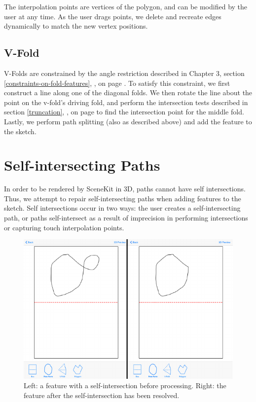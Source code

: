 The interpolation points are vertices of the polygon, and can be
modified by the user at any time. As the user drags points, we delete
and recreate edges dynamically to match the new vertex positions.

\subsection{V-Fold}\label{v-fold}

V-Folds are constrained by the angle restriction described in Chapter 3,
section \ref{constraints-on-fold-features},
, on page
\pageref{geometric-constraints}. To satisfy this constraint, we first
construct a line along one of the diagonal folds. We then rotate the
line about the point on the v-fold's driving fold, and perform the
intersection tests described in section \ref{truncation},
, on page \pageref{truncation} to find the
intersection point for the middle fold. Lastly, we perform path
splitting (also as described above) and add the feature to the sketch.

\section{Self-intersecting Paths}\label{self-intersecting-paths}

In order to be rendered by SceneKit in 3D, paths cannot have self
intersections. Thus, we attempt to repair self-intersecting paths when
adding features to the sketch. Self intersections occur in two ways: the
user creates a self-intersecting path, or paths self-intersect as a
result of imprecision in performing intersections or capturing touch
interpolation points. ~ ~

\begin{figure}[htbp]
\centering
\includegraphics{figures/41_Tech_Tool_Implementation/loopBeforeAfter.pdf}
\caption{Left: a feature with a self-intersection before processing.
Right: the feature after the self-intersection has been resolved.}
\end{figure}

